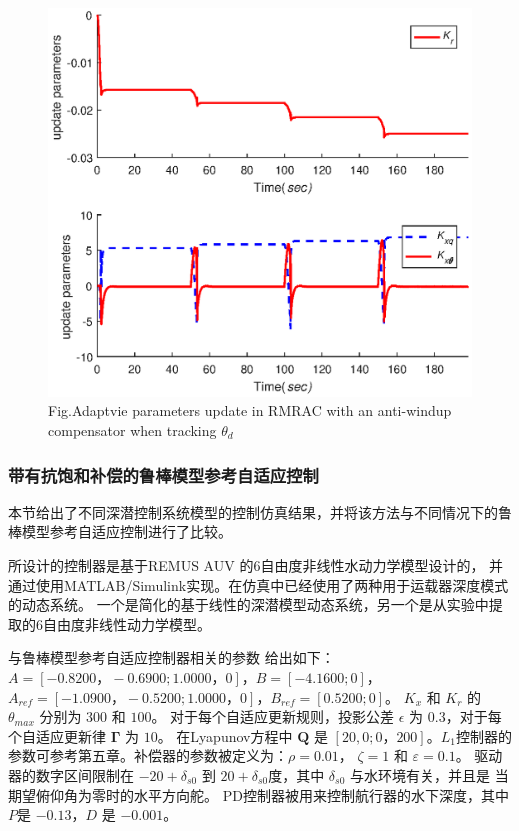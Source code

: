 \begin{figure}[h]%
\centering
\includegraphics[width=0.85\linewidth]{figure/chap6/Fig1_pulse_theta2.eps}
\label{fig:chap6:F8}
 {Fig.}{Adaptvie parameters update in RMRAC with an anti-windup compensator when tracking $\theta_{d}$}
\end{figure}

\subsubsection{带有抗饱和补偿的鲁棒模型参考自适应控制 }
本节给出了不同深潜控制系统模型的控制仿真结果，并将该方法与不同情况下的鲁棒模型参考自适应控制进行了比较。

所设计的控制器是基于REMUS AUV 的6自由度非线性水动力学模型设计的， 并通过使用MATLAB/Simulink实现。在仿真中已经使用了两种用于运载器深度模式的动态系统。 一个是简化的基于线性的深潜模型动态系统，另一个是从实验中提取的6自由度非线性动力学模型\cite{prestero2001verification}。

与鲁棒模型参考自适应控制器相关的参数
给出如下：$ A= [-0.8200，-0.6900; 1.0000，0]$，$B = [ - 4.1600; 0]$，$ A_ {ref} = [ - 1.0900，-0.5200; 1.0000，0]$，$B_ {ref} = [0.5200;0]$。 $K_x$ 和 $K_r$ 的 $\theta_ {max}$ 分别为 $300$ 和 $100$。 对于每个自适应更新规则，投影公差 $\epsilon$ 为 $0.3$，对于每个自适应更新律 $\bm{\Gamma}$ 为 $10$。 在Lyapunov方程中 $\bm {Q} $ 是 $[20,0; 0，200]$。$L_1$控制器的参数可参考第五章。补偿器的参数被定义为：$\rho = 0.01$， $\zeta = 1$ 和 $\varepsilon = 0.1$。 驱动器的数字区间限制在 $-20 + \delta_{s0}$ 到 $20 + \delta_{s0}$度，其中 $\delta_{s0}$ 与水环境有关，并且是 当期望俯仰角为零时的水平方向舵。 PD控制器被用来控制航行器的水下深度，其中 $P$是 $-0.13$，$D$ 是 $-0.001$。

